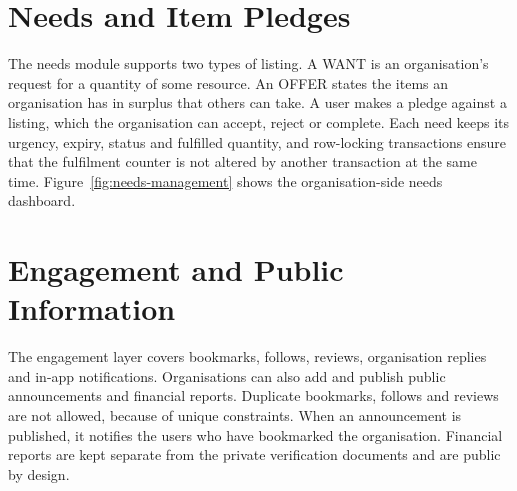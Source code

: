 
\section{Needs and Item Pledges}
\label{sec:impl-needs}
The needs module supports two types of listing. A WANT is an organisation's request for a quantity of some resource. An OFFER states the items an organisation has in surplus that others can take. A user makes a pledge against a listing, which the organisation can accept, reject or complete. Each need keeps its urgency, expiry, status and fulfilled quantity, and row-locking transactions ensure that the fulfilment counter is not altered by another transaction at the same time. Figure~\ref{fig:needs-management} shows the organisation-side needs dashboard.

\section{Engagement and Public Information}
\label{sec:impl-engagement}
The engagement layer covers bookmarks, follows, reviews, organisation replies and in-app notifications. Organisations can also add and publish public announcements and financial reports. Duplicate bookmarks, follows and reviews are not allowed, because of unique constraints. When an announcement is published, it notifies the users who have bookmarked the organisation. Financial reports are kept separate from the private verification documents and are public by design.

